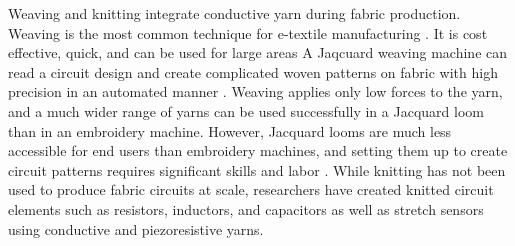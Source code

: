 Weaving \cite{bonderover2004woven, dhawan2004woven2,dhawan2004woven1} and knitting \cite{farringdon1999wearable} integrate conductive yarn during fabric production.
Weaving is the most common technique for e-textile manufacturing \cite{nakad2007using}. It is cost effective, quick, and can be used for large areas
A Jaqcuard weaving machine can read a circuit design and create complicated woven patterns on fabric with high precision in an automated manner \cite{poupyrev2016project}. Weaving applies only low forces to the yarn, and a much wider range of yarns can be used successfully in a Jacquard loom than in an embroidery machine.
However, Jacquard looms are much less accessible for end users than embroidery machines, and setting them up to create circuit patterns requires significant skills and labor \cite{linz2008embroidered}. While knitting has not been used to produce fabric circuits at scale, researchers have created knitted circuit elements such as resistors, inductors, and capacitors \cite{wijesiriwardana2004fibre} as well as stretch sensors \cite{paradiso2005wearable} using conductive and piezoresistive yarns. 


